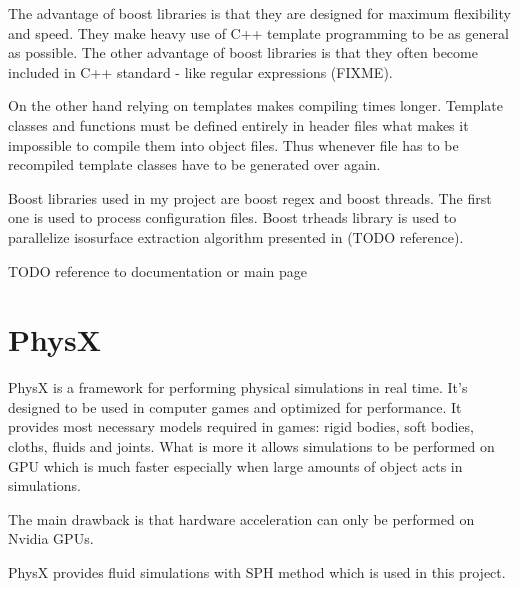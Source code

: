 The advantage of boost libraries is that they are designed for maximum flexibility and speed. They make heavy use of C++ template programming to be as general as possible. The other advantage of boost libraries is that they often become included in C++ standard - like regular expressions (FIXME). 

On the other hand relying on templates makes compiling times longer. Template classes and functions must be defined entirely in header files what makes it impossible to compile them into object files. Thus whenever file has to be recompiled template classes have to be generated over again.

Boost libraries used in my project are boost regex and boost threads. The first one is used to process configuration files. Boost trheads library is used to parallelize isosurface extraction algorithm presented in (TODO reference).

TODO reference to documentation or main page

\section{PhysX}

PhysX is a framework for performing physical simulations in real time. It's designed to be used in computer games and optimized for performance. It provides most necessary models required in games: rigid bodies, soft bodies, cloths, fluids and joints. What is more it allows simulations to be performed on GPU which is much faster especially when large amounts of object acts in simulations.

The main drawback is that hardware acceleration can only be performed on Nvidia GPUs. 

PhysX provides fluid simulations with SPH method which is used in this project. 




